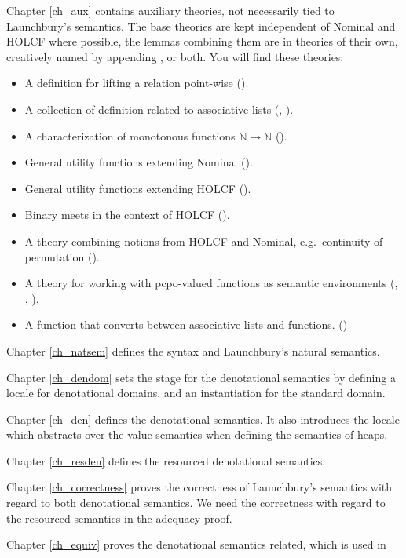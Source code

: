 \documentclass[11pt,a4paper,parskip=half]{scrartcl}
\begin{document}
Chapter \ref{ch_aux} contains auxiliary theories, not necessarily tied to Launchbury's semantics. The base theories are kept independent of Nominal and HOLCF where possible, the lemmas combining them are in theories of their own, creatively named by appending ,  or both.  You will find these theories:
\begin{itemize}
\item A definition for lifting a relation point-wise ().
\item A collection of definition related to associative lists (, ).
\item A characterization of monotonous functions $\mathbb N \to \mathbb N$ ().
\item General utility functions extending Nominal ().
\item General utility functions extending HOLCF ().
\item Binary meets in the context of HOLCF ().
\item A theory combining notions from HOLCF and Nominal, e.g.\ continuity of permutation ().
\item A theory for working with pcpo-valued functions as semantic environments (, , ).
\item A function  that converts between associative lists and functions. ()
\end{itemize}

Chapter \ref{ch_natsem} defines the syntax and Launchbury's natural semantics.

Chapter \ref{ch_dendom} sets the stage for the denotational semantics by defining a locale  for denotational domains, and an instantiation for the standard domain.

Chapter \ref{ch_den} defines the denotational semantics. It also introduces the locale  which abstracts over the value semantics when defining the semantics of heaps.

Chapter \ref{ch_resden} defines the resourced denotational semantics.

Chapter \ref{ch_correctness} proves the correctness of Launchbury's semantics with regard to both denotational semantics. We need the correctness with regard to the resourced semantics in the adequacy proof.

Chapter \ref{ch_equiv} proves the denotational semantics related, which is used in
\end{document}
